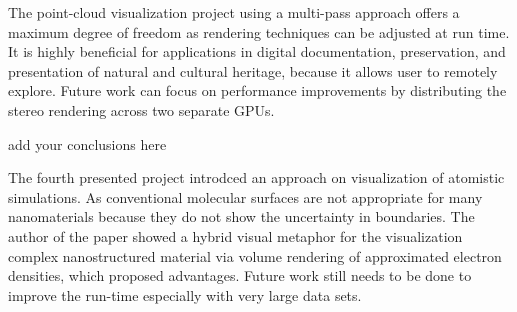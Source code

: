 \documentclass[10pt,twocolumn,letterpaper]{article}
\begin{document}
The point-cloud visualization project \cite{discher_point-based_2018} using a multi-pass approach offers a maximum degree of freedom as rendering techniques can be adjusted at run time. It is highly beneficial for applications in digital documentation, preservation, and presentation of natural and cultural heritage, because it allows user to remotely explore. Future work can focus on performance improvements by distributing the stereo rendering across two separate GPUs.

add your conclusions here




The fourth presented project \cite{reda_visualizing_2013} introdced an approach on visualization of atomistic simulations. As conventional molecular surfaces are not appropriate for many nanomaterials because they do not show the uncertainty in boundaries. The author of the paper showed a hybrid visual metaphor for the visualization complex nanostructured material via volume rendering of approximated electron densities, which proposed advantages. Future work still needs to be done to improve the run-time especially with very large data sets.

{\small


}
\end{document}
